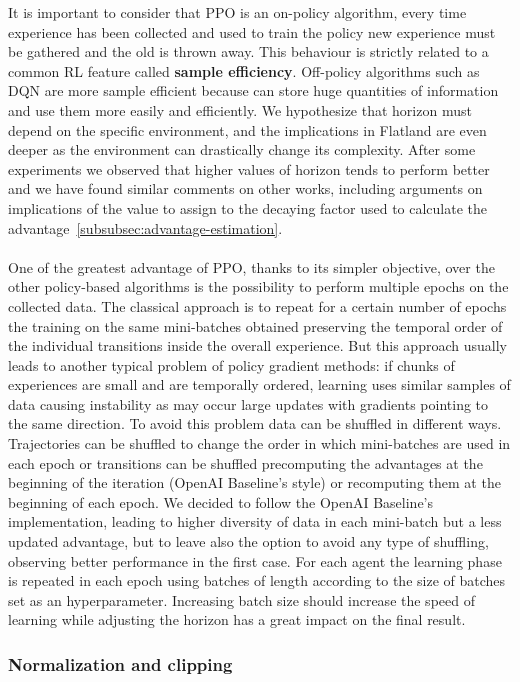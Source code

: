 \documentclass[11pt, a4paper, hidelinks]{report}
\begin{document}
It is important to consider that PPO is an on-policy algorithm, every time experience has been collected and used to train the policy new experience must be gathered and the old is thrown away.
This behaviour is strictly related to a common RL feature called \textbf{sample efficiency}.
Off-policy algorithms such as DQN are more sample efficient because can store huge quantities of information and use them more easily and efficiently.
We hypothesize that horizon must depend on the specific environment, and the implications in Flatland are even deeper as the environment can drastically change its complexity.
After some experiments we observed that higher values of horizon tends to perform better and we have found similar comments on other works, including arguments on implications of the value to assign to the decaying factor used to calculate the advantage~\ref{subsubsec:advantage-estimation}.\\
\\
One of the greatest advantage of PPO, thanks to its simpler objective, over the other policy-based algorithms is the possibility to perform multiple epochs on the collected data.
The classical approach is to repeat for a certain number of epochs the training on the same mini-batches obtained preserving the temporal order of the individual transitions inside the overall experience.
But this approach usually leads to another typical problem of policy gradient methods: if chunks of experiences are small and are temporally ordered, learning uses similar samples of data causing instability as may occur large updates with gradients pointing to the same direction.
To avoid this problem data can be shuffled in different ways.
Trajectories can be shuffled to change the order in which mini-batches are used in each epoch or transitions can be shuffled precomputing the advantages at the beginning of the iteration (OpenAI Baseline's style) or recomputing them at the beginning of each epoch.
We decided to follow the OpenAI Baseline's implementation, leading to higher diversity of data in each mini-batch but a less updated advantage, but to leave also the option to avoid any type of shuffling, observing better performance in the first case.
For each agent the learning phase is repeated in each epoch using batches of length according to the size of batches set as an hyperparameter.
Increasing batch size should increase the speed of learning while adjusting the horizon has a great impact on the final result.

\subsubsection{Normalization and clipping}
\end{document}
